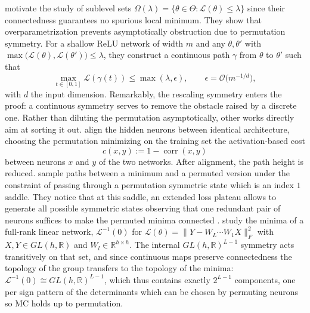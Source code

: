 \documentclass[mathematics,review,submit,moreauthors]{Definitions/mdpi}
\begin{document}
\citet{freeman2017} motivate the study of sublevel sets $\Omega(\lambda)=\{\theta\in\Theta:\mathcal{L}(\theta)\le\lambda\}$ since their connectedness guarantees no spurious local minimum.
They show that overparametrization prevents asymptotically obstruction due to permutation symmetry.
For a shallow ReLU network of width $m$ and any $\theta,\theta'$ with $\max\big(\mathcal{L}(\theta),\mathcal{L}(\theta')\big)\le\lambda$, they construct a continuous path $\gamma$ from $\theta$ to $\theta'$ such that
\begin{equation*}
    \max_{t\in[0,1]}\mathcal{L}(\gamma(t))\le\max(\lambda,\epsilon),\qquad \epsilon=\mathcal{O}\big(m^{-1/d}\big),
\end{equation*}
with $d$ the input dimension.
Remarkably, the rescaling symmetry enters the proof: a continuous symmetry serves to remove the obstacle raised by a discrete one.
Rather than diluting the permutation asymptotically, other works directly aim at sorting it out.
\citet{tatro2020} align the hidden neurons between identical architecture, choosing the permutation minimizing on the training set the activation-based cost
\begin{equation*}
    c(x,y):=1-\operatorname{corr}(x,y)
\end{equation*}
between neurons $x$ and $y$ of the two networks.
After alignment, the path height is reduced.
\citet{brea2019} sample paths between a minimum and a permuted version under the constraint of passing through a permutation symmetric state which is an index $1$ saddle.
They notice that at this saddle, an extended loss plateau allows to generate all possible symmetric states observing that one redundant pair of neurons suffices to make the permuted minima connected \citep{brea2019,simsek2021}.
\citet{zhao2025a} study the minima of a full-rank linear network, $\mathcal{L}^{-1}(0)$ for $\mathcal{L}(\theta)=\lVert Y-W_L\cdots W_1X\rVert_F^2$ with $X,Y\in GL(h,\mathbb{R})$ and $W_l\in\mathbb{R}^{h\times h}$.
The internal $GL(h,\mathbb{R})^{L-1}$ symmetry acts transitively on that set, and since continuous maps preserve connectedness the topology of the group transfers to the topology of the minima: $\mathcal{L}^{-1}(0)\cong GL(h,\mathbb{R})^{L-1}$, which thus contains exactly $2^{L-1}$ components, one per sign pattern of the determinants which can be chosen by permuting neurons so MC holds up to permutation.
\end{document}
